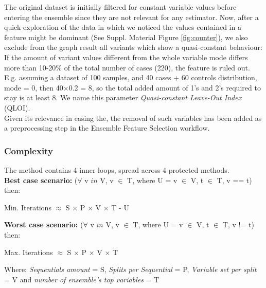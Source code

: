 The original dataset is initially filtered for constant variable values before entering the ensemble since they are not relevant for any estimator. Now, after a quick exploration of the data in which we noticed the values contained in a feature might be dominant (See Suppl. Material Figure \ref{fig:counter}), we also exclude from the graph result all variants which show a quasi-constant behaviour: If the amount of variant values different from the whole variable mode differs more than 10-20\% of the total number of cases (220), the feature is ruled out. E.g. assuming a dataset of 100 samples, and 40 cases + 60 controls distribution, mode = 0, then 40$\times$0.2 = 8, so the total added amount of 1's and 2's required to stay is at least 8.
We name this parameter \emph{Quasi-constant Leave-Out Index} (QLOI).
\\

Given its relevance in easing the, the removal of such variables has been added as a preprocessing step in the Ensemble Feature Selection workflow.

\subsubsection{Complexity}
\label{section:methods:complex}
The method contains 4 inner loops, spread across 4 protected methods.
\\

\textbf{Best case scenario:} ($\forall$ v $in$ V, v $\in$ T, where U = v $\in$ V, t $\in$ T, v == t) then:
\begin{center}
Min. Iterations $\approx$ S $\times$ P $\times$ V $\times$ T - U\\    
\end{center}

\textbf{Worst case scenario:} ($\forall$ v $in$ V, v $\in$ T, where U = v $\in$ V, t $\in$ T, v != t) then:
\begin{center}
Max. Iterations $\approx$ S $\times$ P $\times$ V $\times$ T\\    
\end{center}


Where: \textit{Sequentials amount} = S, \textit{Splits per Sequential} = P, \textit{Variable set per split} = V and \textit{number of ensemble’s top variables} = T


